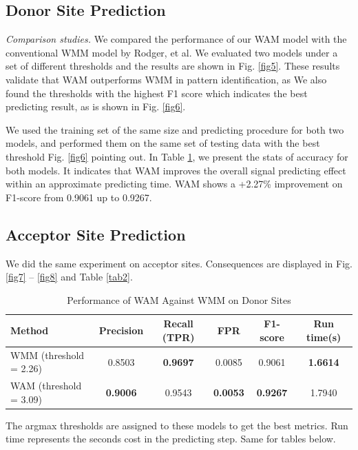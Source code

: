 \documentclass[journal,twoside]{IEEEtran}
\begin{document}
\subsection{Donor Site Prediction}\label{4.1}
\emph{Comparison studies. } We compared the performance of our WAM model with the conventional WMM model by Rodger, et al. \cite{staden1984computer} We evaluated two models under a set of different thresholds and the results are shown in Fig. \ref{fig5}. These results validate that WAM outperforms WMM in pattern identification, as  We also found the thresholds with the highest F1 score which indicates the best predicting result, as is shown in Fig. \ref{fig6}. 

We used the training set of the same size and predicting procedure for both two models, and performed them on the same set of testing data with the best threshold Fig. \ref{fig6} pointing out. In Table \ref{tab1}, we present the stats of accuracy for both models. It indicates that WAM improves the overall signal predicting effect within an approximate predicting time. WAM shows a +2.27\% improvement on F1-score from 0.9061 up to 0.9267. 

\subsection{Acceptor Site Prediction}\label{4.2}

We did the same experiment on acceptor sites. Consequences are displayed in Fig. \ref{fig7} -- \ref{fig8} and Table \ref{tab2}. 

\begin{table}[htbp]
\begin{center}
\begin{threeparttable}
\caption{Performance of WAM Against WMM on Donor Sites}
\begin{tabular}{lccccc}
\toprule
Method & Precision & Recall (TPR) & FPR & F1-score & Run time(s) \\
\midrule
WMM (threshold = 2.26) & 0.8503 & \textbf{0.9697} & 0.0085 & 0.9061 & \textbf{1.6614} \\
WAM (threshold = 3.09) & \textbf{0.9006} & 0.9543 & \textbf{0.0053} &  \textbf{0.9267} & 1.7940 \\
\bottomrule
\end{tabular}
\begin{tablenotes}
    \footnotesize
    \item[1] The argmax thresholds are assigned to these models to get the best metrics. Run time represents the seconds cost in the predicting step. Same for tables below. 
\end{tablenotes}
\label{tab1}
\end{threeparttable}
\end{center}
\end{table}
\end{document}
